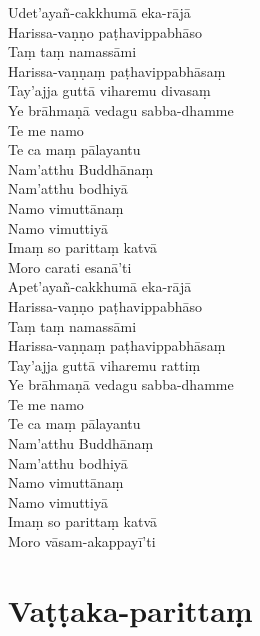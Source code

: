 \begin{paritta}
Udet'ayañ-cakkhumā eka-rājā\\
Harissa-vaṇṇo paṭhavippabhāso\\
Taṃ taṃ namassāmi\\
Harissa-vaṇṇaṃ paṭhavippabhāsaṃ\\
Tay'ajja guttā viharemu divasaṃ\\
Ye brāhmaṇā vedagu sabba-dhamme\\
Te me namo\\
Te ca maṃ pālayantu\\
Nam'atthu Buddhānaṃ\\
Nam'atthu bodhiyā\\
Namo vimuttānaṃ\\
Namo vimuttiyā\\
Imaṃ so parittaṃ katvā\\
Moro carati esanā'ti\\
Apet'ayañ-cakkhumā eka-rājā\\
Harissa-vaṇṇo paṭhavippabhāso\\
Taṃ taṃ namassāmi\\
Harissa-vaṇṇaṃ paṭhavippabhāsaṃ\\
Tay'ajja guttā viharemu rattiṃ\\
Ye brāhmaṇā vedagu sabba-dhamme\\
Te me namo\\
Te ca maṃ pālayantu\\
Nam'atthu Buddhānaṃ\\
Nam'atthu bodhiyā\\
Namo vimuttānaṃ\\
Namo vimuttiyā\\
Imaṃ so parittaṃ katvā\\
Moro vāsam-akappayī'ti

\end{paritta}

\chapter{Vaṭṭaka-parittaṃ}%

